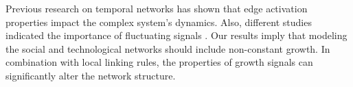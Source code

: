 Previous research on temporal networks \cite{holme2012} has shown that edge activation properties impact the complex system's dynamics. Also, different studies indicated the importance of fluctuating signals \cite{huberman1999, mitrovic2015, liu2019}. Our results imply that modeling the social and technological networks should include non-constant growth. In combination with local linking rules, the properties of growth signals can significantly alter the network structure. 



